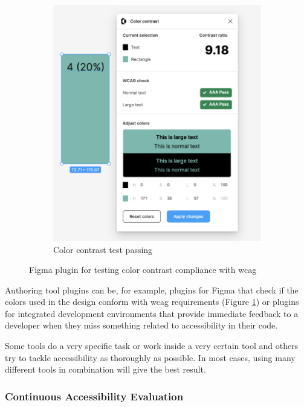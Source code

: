 \documentclass{master_thesis}
\begin{document}
\begin{figure}[ht]
\begin{subfigure}{0.4\textwidth}
		\includegraphics[width=\textwidth]{img/figma plugin-color-contrast-pass.png}
		\caption{Color contrast test passing}
	\end{subfigure}
\caption{Figma plugin for testing color contrast compliance with \ac{wcag}}
\label{fig:figma-plugin}
\end{figure}

Authoring tool plugins can be, for example, plugins for Figma that check if the colors used in the design conform with \ac{wcag} requirements (Figure \ref{fig:figma-plugin}) or plugins for integrated development environments that provide immediate feedback to a developer when they miss something related to accessibility in their code.

Some tools do a very specific task or work inside a very certain tool and others try to tackle accessibility as thoroughly as possible. In most cases, using many different tools in combination will give the best result.

\subsubsection{Continuous Accessibility Evaluation} \label{continuous-a11y-evaluation}
\end{document}
